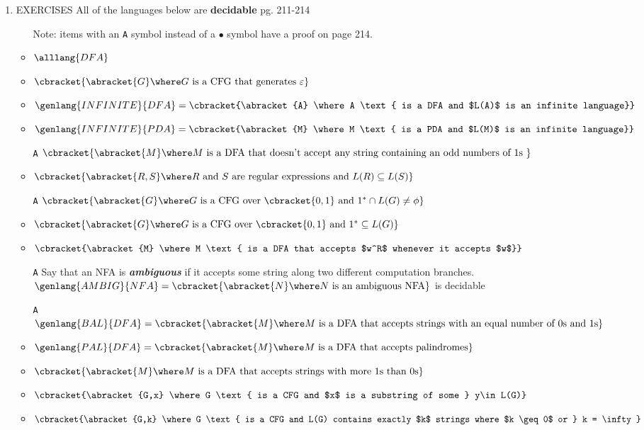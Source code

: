\documentclass[12pt]{article} %
\newcommand{\theoremitem}[3]{\item #1 \quad #2 \dotfill #3}
\newenvironment{theoremlist} {
    \begin{enumerate}[nosep,leftmargin=*,label={}]
} {
    \end{enumerate}
}
\begin{document}
\begin{theoremlist}
    \theoremitem{EXERCISES}
    {All of the languages below are \textbf{decidable}}
    {pg. 211-214}
    \begin{itemize}[nosep]
        \item[] Note: items with an \texttt{A} symbol instead of a $\bullet$ symbol have a proof on page 214.
        \item $\alllang{DFA}$
        \item $\cbracket{\abracket{G} \where G \text{ is a CFG that generates } \varepsilon}$
        \item $\genlang{INFINITE}{DFA}=\cbracket{\abracket{A} \where A \text{ is a DFA and $L(A)$ is an infinite language}}$
        \item $\genlang{INFINITE}{PDA}=\cbracket{\abracket{M} \where M \text{ is a PDA and $L(M)$ is an infinite language}}$
        \item[\texttt{A}] $\cbracket{\abracket{M} \where M \text{ is a DFA that doesn’t accept any string containing an odd numbers of 1s }}$
        \item $\cbracket{\abracket{R,S} \where R \text{ and } S \text{ are regular expressions and } L(R)\subseteq L(S)}$
        \item[\texttt{A}] $\cbracket{\abracket{G} \where G \text{ is a CFG over } \cbracket{0,1} \text{ and } 1^* \cap L(G) \neq \phi}$
        \item $\cbracket{\abracket{G} \where G \text{ is a CFG over } \cbracket{0,1} \text{ and } 1^* \subseteq L(G)}$
        \item $\cbracket{\abracket{M} \where M \text{ is a DFA that accepts $w^R$ whenever it accepts $w$}}$
        \item[\texttt{A}] Say that an NFA is \emph{\textbf{ambiguous}} if it accepts some string along two different computation branches.
        $\genlang{AMBIG}{NFA}=\cbracket{\abracket{N} \where N \text{ is an ambiguous NFA}}$ is decidable
        \item[\texttt{A}] $\genlang{BAL}{DFA}=\cbracket{\abracket{M} \where M \text{ is a DFA that accepts strings with an equal number of 0s and 1s}}$
        \item $\genlang{PAL}{DFA}=\cbracket{\abracket{M} \where M \text{ is a DFA that accepts palindromes}}$
        \item $\cbracket{\abracket{M} \where M \text{ is a DFA that accepts strings with more 1s than 0s}}$
        \item $\cbracket{\abracket{G,x} \where G \text{ is a CFG and $x$ is a substring of some } y\in L(G)}$
        \item $\cbracket{\abracket{G,k} \where G \text{ is a CFG and L(G) contains exactly $k$ strings where $k \geq 0$ or } k = \infty}$
    \end{itemize}


\end{theoremlist}
\end{document}
